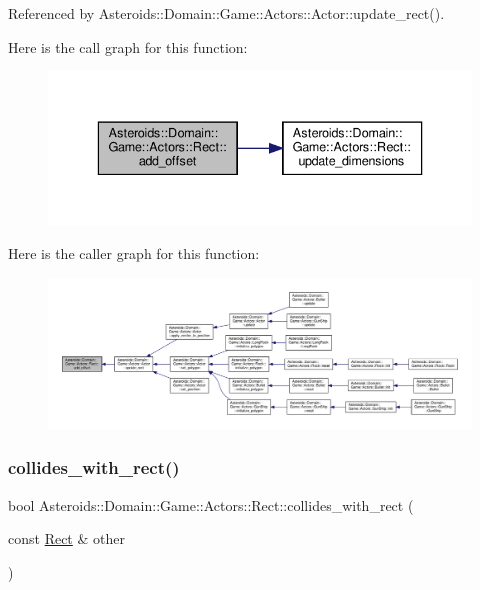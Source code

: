 Referenced by Asteroids\+::\+Domain\+::\+Game\+::\+Actors\+::\+Actor\+::update\+\_\+rect().

Here is the call graph for this function\+:\nopagebreak
\begin{figure}[H]
\begin{center}
\leavevmode
\includegraphics[width=336pt]{classAsteroids_1_1Domain_1_1Game_1_1Actors_1_1Rect_a0ab06f4fe6e0dbd681c89397f22aa08f_cgraph}
\end{center}
\end{figure}
Here is the caller graph for this function\+:\nopagebreak
\begin{figure}[H]
\begin{center}
\leavevmode
\includegraphics[width=350pt]{classAsteroids_1_1Domain_1_1Game_1_1Actors_1_1Rect_a0ab06f4fe6e0dbd681c89397f22aa08f_icgraph}
\end{center}
\end{figure}
\mbox{\label{classAsteroids_1_1Domain_1_1Game_1_1Actors_1_1Rect_acc14c3d293e2bfd3b55aa6e727457bf0}} 
\subsubsection{\texorpdfstring{collides\+\_\+with\+\_\+rect()}{collides\_with\_rect()}}
{\footnotesize\ttfamily bool Asteroids\+::\+Domain\+::\+Game\+::\+Actors\+::\+Rect\+::collides\+\_\+with\+\_\+rect (\begin{DoxyParamCaption}\item[{const \hyperlink{classAsteroids_1_1Domain_1_1Game_1_1Actors_1_1Rect}{Rect} \&}]{other }\end{DoxyParamCaption})}




